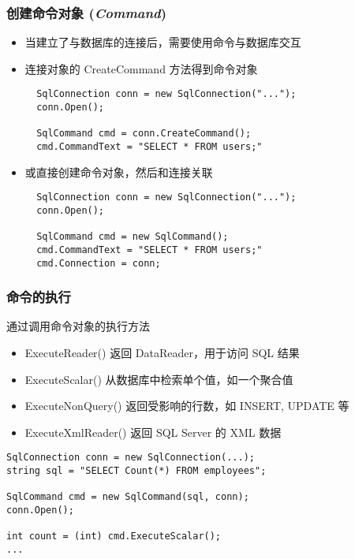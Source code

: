 \begin{frame}[fragile]
\frametitle{创建命令对象 (\textit{Command})}
\begin{itemize}
\item 当建立了与数据库的连接后，需要使用命令与数据库交互
\item 连接对象的 CreateCommand 方法得到命令对象
\begin{lstlisting}
  SqlConnection conn = new SqlConnection("...");
  conn.Open();

  SqlCommand cmd = conn.CreateCommand();
  cmd.CommandText = "SELECT * FROM users;"
\end{lstlisting}
\item 或直接创建命令对象，然后和连接关联
\begin{lstlisting}
  SqlConnection conn = new SqlConnection("...");
  conn.Open();

  SqlCommand cmd = new SqlCommand();
  cmd.CommandText = "SELECT * FROM users;"
  cmd.Connection = conn;
\end{lstlisting}
\end{itemize}
\end{frame}

\begin{frame}[fragile]
\frametitle{命令的执行}
通过调用命令对象的执行方法

\begin{itemize}
\item \small ExecuteReader() 返回 DataReader，用于访问 SQL 结果
\item \small ExecuteScalar() 从数据库中检索单个值，如一个聚合值
\item \small ExecuteNonQuery() 返回受影响的行数，如 INSERT, UPDATE 等
\item \small ExecuteXmlReader() 返回 SQL Server 的 XML 数据
\end{itemize}
\begin{lstlisting}
SqlConnection conn = new SqlConnection(...);
string sql = "SELECT Count(*) FROM employees";

SqlCommand cmd = new SqlCommand(sql, conn);
conn.Open();

int count = (int) cmd.ExecuteScalar();
...
\end{lstlisting}
\end{frame}


